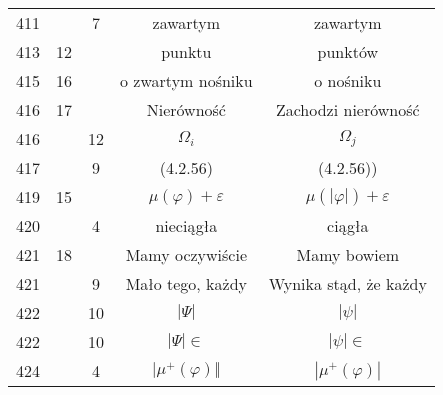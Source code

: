 \documentclass[a4paper,11pt]{article}
\begin{document}
\begin{center}
\begin{tabular}{|c|c|c|c|c|}
    411 & &  7 & zawartym & zawartym \\
    413 & 12 & & punktu & punktów \\
    415 & 16 & & o zwartym nośniku & o nośniku \\
    416 & 17 & & Nierówność & Zachodzi nierówność \\
    416 & & 12 & $\Omega_{ i }$ & $\Omega_{ j }$ \\
    417 & &  9 & (4.2.56) & (4.2.56)) \\
    419 & 15 & & $\mu( \varphi ) + \varepsilon$ & $\mu( | \varphi | ) + \varepsilon$ \\
    420 & &  4 & nieciągła & ciągła \\
    421 & 18 & & Mamy oczywiście & Mamy bowiem \\
    421 & &  9 & Mało tego, każdy & Wynika stąd, że każdy \\
    422 & & 10 & $| \Psi | $ & $| \psi |$ \\
    422 & & 10 & $| \Psi | \in$ & $| \psi | \in$ \\
    424 & &  4 & $| \mu^{ + }( \varphi ) \Vert$ & $| \mu^{ + }( \varphi ) |$ \\
    \hline
  \end{tabular}

\end{center}
\end{document}
